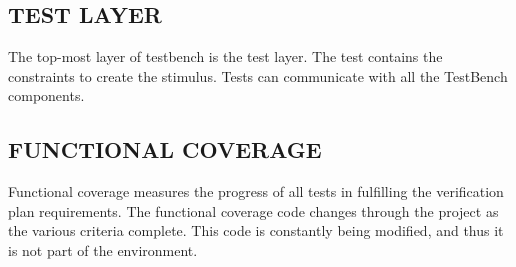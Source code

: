 \subsection{TEST LAYER}
The top-most layer of testbench is the test layer. The test contains the constraints to create the stimulus. Tests can communicate with all the TestBench components.

\subsection{FUNCTIONAL COVERAGE}
Functional coverage measures the progress of all tests in fulfilling the verification plan requirements. The functional coverage code changes through the project as the various criteria complete. This code is constantly being modified, and thus it is not part of the environment.
